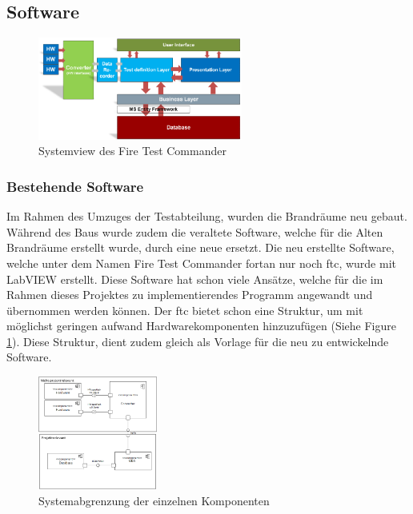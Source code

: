 \documentclass[10pt]{scrartcl}
\begin{document}
\subsection{Software}
\begin{figure}
	\begin{center}
		\includegraphics[width=0.6\textwidth]{SystemviewFTC}
		\caption{Systemview des Fire Test Commander}
		\label{fig:SystemViewFTC}
	\end{center}
\end{figure}
\subsubsection{Bestehende Software}
Im Rahmen des Umzuges der Testabteilung, wurden die Brandräume neu gebaut. Während des Baus wurde zudem die veraltete Software, welche für die Alten Brandräume erstellt wurde, durch eine neue ersetzt. Die neu erstellte Software, welche unter dem Namen Fire Test Commander fortan nur noch \acrshort{ftc}, wurde mit \gls{LabVIEW} erstellt. Diese Software hat schon viele Ansätze, welche für die im Rahmen dieses Projektes zu implementierendes Programm angewandt und übernommen werden können. Der \acrshort{ftc} bietet schon eine Struktur, um mit möglichst geringen aufwand Hardwarekomponenten hinzuzufügen (Siehe Figure \ref{fig:SystemViewFTC}). Diese Struktur, dient zudem gleich als Vorlage für die neu zu entwickelnde Software.
\begin{figure}
		\begin{center}
			\includegraphics[width=0.35\textwidth]{Systemgrenzen}
			\caption{Systemabgrenzung der einzelnen Komponenten}
			\label{fig:SystemView}			
		\end{center}
\end{figure}
\end{document}

